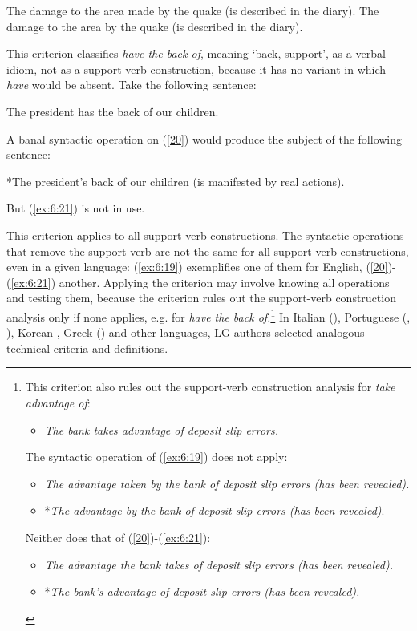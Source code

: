 \documentclass[output=paper]{langsci/langscibook}
\begin{document}
\begin{exe}
\ex \label{ex:6:19}
\begin{xlist}
\ex \label{ex:6:19a}
The damage to the area made by the quake (is described in the diary).
\ex \label{ex:6:19b}
The damage to the area by the quake (is described in the diary).
\end{xlist}
\end{exe}

\noindent This criterion classifies \textit{have the back of}, meaning ‘back, support’, as a verbal idiom, not as a support-verb construction, because it has no variant in which \textit{have} would be absent. Take the following sentence:



\begin{exe}
\ex \label{20}
The president has the back of our children.
\end{exe}
	 
\noindent A banal syntactic operation on (\ref{20}) would produce the subject of the following sentence:


\begin{exe}
\ex \label{ex:6:21}
*The president’s back of our children (is manifested by real actions).
\end{exe}

\noindent But (\ref{ex:6:21}) is not in use.

This criterion applies to all support-verb constructions. The syntactic operations that remove the support verb are not the same for all support-verb constructions, even in a given language: (\ref{ex:6:19}) exemplifies one of them for English, (\ref{20})-(\ref{ex:6:21}) another. Applying the criterion may involve knowing all operations and testing them, because the criterion rules out the support-verb construction analysis only if none applies, e.g. for \textit{have the back of.}\footnote{ This criterion also rules out the support-verb construction analysis for \textit{take advantage of}: 
\begin{itemize}
\item[] \textit{The bank takes advantage of deposit slip errors.} 
\end{itemize}
The syntactic operation of (\ref{ex:6:19}) does not apply:  
\begin{itemize}
\item[] \textit{The advantage taken by the bank of deposit slip errors (has been revealed).} 
\item[]  *\textit{The advantage by the bank of deposit slip errors (has been revealed)}. 
\end{itemize}
Neither does that of (\ref{20})-(\ref{ex:6:21}): 
\begin{itemize}
\item[] \textit{The advantage the bank takes of deposit slip errors (has been revealed).}
\item[]  *\textit{The bank’s advantage of deposit slip errors (has been revealed).}
\end{itemize}} 
In Italian (\citealt{Angelis1989}), Portuguese (\citealt{Ranchhod1990}, \citealt{Rassi}), Korean \citep{Han2000}, Greek (\citealt{Kyriacopoulou2003}) and other languages, LG authors selected analogous technical criteria and definitions. 
\end{document}
